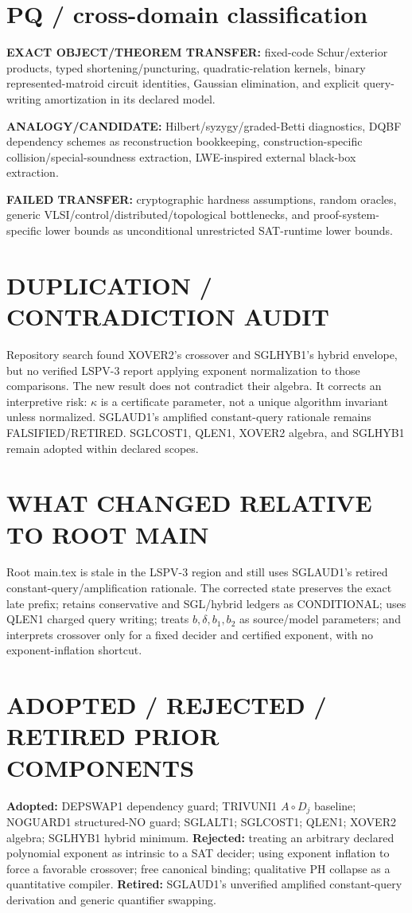 \documentclass[11pt]{article}
\begin{document}
\section*{PQ / cross-domain classification}
\textbf{EXACT OBJECT/THEOREM TRANSFER:} fixed-code Schur/exterior products, typed shortening/puncturing, quadratic-relation kernels, binary represented-matroid circuit identities, Gaussian elimination, and explicit query-writing amortization in its declared model.

\textbf{ANALOGY/CANDIDATE:} Hilbert/syzygy/graded-Betti diagnostics, DQBF dependency schemes as reconstruction bookkeeping, construction-specific collision/special-soundness extraction, LWE-inspired external black-box extraction.

\textbf{FAILED TRANSFER:} cryptographic hardness assumptions, random oracles, generic VLSI/control/distributed/topological bottlenecks, and proof-system-specific lower bounds as unconditional unrestricted SAT-runtime lower bounds.

\section*{DUPLICATION / CONTRADICTION AUDIT}
Repository search found XOVER2's crossover and SGLHYB1's hybrid envelope, but no verified LSPV-3 report applying exponent normalization to those comparisons. The new result does not contradict their algebra. It corrects an interpretive risk: \(\kappa\) is a certificate parameter, not a unique algorithm invariant unless normalized. SGLAUD1's amplified constant-query rationale remains FALSIFIED/RETIRED. SGLCOST1, QLEN1, XOVER2 algebra, and SGLHYB1 remain adopted within declared scopes.

\section*{WHAT CHANGED RELATIVE TO ROOT MAIN}
Root main.tex is stale in the LSPV-3 region and still uses SGLAUD1's retired constant-query/amplification rationale. The corrected state preserves the exact late prefix; retains conservative and SGL/hybrid ledgers as CONDITIONAL; uses QLEN1 charged query writing; treats \(b,\delta,b_1,b_2\) as source/model parameters; and interprets crossover only for a fixed decider and certified exponent, with no exponent-inflation shortcut.

\section*{ADOPTED / REJECTED / RETIRED PRIOR COMPONENTS}
\textbf{Adopted:} DEPSWAP1 dependency guard; TRIVUNI1 \(A\circ D_j\) baseline; NOGUARD1 structured-NO guard; SGLALT1; SGLCOST1; QLEN1; XOVER2 algebra; SGLHYB1 hybrid minimum.
\textbf{Rejected:} treating an arbitrary declared polynomial exponent as intrinsic to a SAT decider; using exponent inflation to force a favorable crossover; free canonical binding; qualitative PH collapse as a quantitative compiler.
\textbf{Retired:} SGLAUD1's unverified amplified constant-query derivation and generic quantifier swapping.
\end{document}
